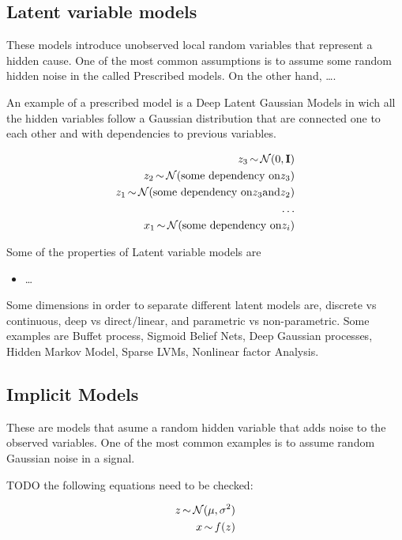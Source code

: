 \documentclass[b5paper]{report}
\begin{document}
\subsection{Latent variable models}

These models introduce unobserved local random variables that represent a
hidden cause. One of the most common assumptions is to assume some random
hidden noise in the called Prescribed models. On the other hand, \dots.

An example of a prescribed model is a Deep Latent Gaussian Models in wich all
the hidden variables follow a Gaussian distribution that are connected one to
each other and with dependencies to
previous variables.

\begin{align}
  z_3 \operatorname*{\sim} \operatorname*{\mathcal{N}}(0, \operatorname*{\mathbf{I}}) \\
  z_2 \operatorname*{\sim} \operatorname*{\mathcal{N}}(\text{some dependency on}z_3) \\
  z_1 \operatorname*{\sim} \operatorname*{\mathcal{N}}(\text{some dependency on}z_3 \text{and} z_2) \\
  \dots \\
  x_1 \operatorname*{\sim} \operatorname*{\mathcal{N}}(\text{some dependency on}z_{i})
\end{align}

Some of the properties of Latent variable models are

\begin{itemize}
  \item \dots
\end{itemize}

Some dimensions in order to separate different latent models are, discrete vs
continuous, deep vs direct/linear, and parametric vs non-parametric. Some
examples are Buffet process, Sigmoid Belief Nets, Deep Gaussian processes,
Hidden Markov Model, Sparse LVMs, Nonlinear factor Analysis.

\subsection{Implicit Models}

These are models that asume a random hidden variable that adds noise to the
observed variables. One of the most common examples is to assume random
Gaussian noise in a signal.

TODO the following equations need to be checked:

\begin{align}
  z \operatorname*{\sim} \operatorname*{\mathcal{N}}(\mu, \sigma^2) \\
  x \operatorname*{\sim} f(z)
\end{align}
\end{document}
